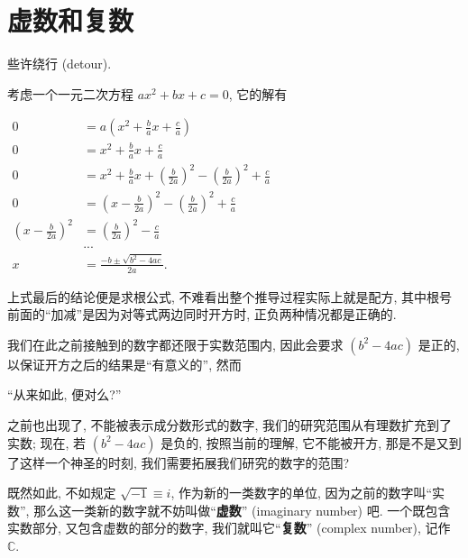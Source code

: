 \section{虚数和复数}\label{006}

\begin{flushright}{\kaishu 些许绕行 (detour).}\end{flushright}

\begin{tcolorbox}[size=fbox, breakable, enhanced jigsaw, title={虚数和复数 (imaginary number and complex number)}]

考虑一个一元二次方程 $ax^2+bx+c=0$, 它的解有

$\begin{aligned}
0&=a\left(x^2+\frac{b}{a}x+\frac{c}{a}\right)\\
0&=x^2+\frac{b}{a}x+\frac{c}{a}\\
0&=x^2+\frac{b}{a}x+\left(\frac{b}{2a}\right)^2-\left(\frac{b}{2a}\right)^2+\frac{c}{a}\\
0&=\left(x-\frac{b}{2a}\right)^2-\left(\frac{b}{2a}\right)^2+\frac{c}{a}\\
\left(x-\frac{b}{2a}\right)^2&=\left(\frac{b}{2a}\right)^2-\frac{c}{a}\\
&...\\
x&=\boxed{\frac{-b\pm\sqrt{b^2-4ac}}{2a}}.
\end{aligned}$

上式最后的结论便是求根公式, 不难看出整个推导过程实际上就是配方,
其中根号前面的``加减''是因为对等式两边同时开方时,
正负两种情况都是正确的.

我们在此之前接触到的数字都还限于实数范围内, 因此会要求
$\left(b^2-4ac\right)$ 是正的, 以保证开方之后的结果是``有意义的'',
然而

\begin{newquote}
    ``从来如此, 便对么?''
\end{newquote}

之前也出现了, 不能被表示成分数形式的数字,
我们的研究范围从有理数扩充到了实数; 现在, 若 $\left(b^2-4ac\right)$
是负的, 按照当前的理解, 它不能被开方, 那是不是又到了这样一个神圣的时刻,
我们需要拓展我们研究的数字的范围?

既然如此, 不如规定 $\sqrt{-1}\equiv i$, 作为新的一类数字的单位,
因为之前的数字叫``实数'', 那么这一类新的数字就不妨叫做``\textbf{虚数}''
(imaginary number) 吧. 一个既包含实数部分, 又包含虚数的部分的数字,
我们就叫它``\textbf{复数}'' (complex number), 记作 $\mathbb{C}$.
\end{tcolorbox}

